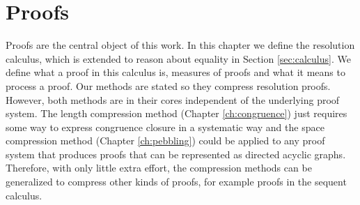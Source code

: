 \chapter*{Proofs}

Proofs are the central object of this work.
In this chapter we define the resolution calculus, which is extended to reason about equality in Section \ref{sec:calculus}.
We define what a proof in this calculus is, measures of proofs and what it means to process a proof.
Our methods are stated so they compress resolution proofs.
However, both methods are in their cores independent of the underlying proof system.
The length compression method (Chapter \ref{ch:congruence}) just requires some way to express congruence closure in a systematic way and the space compression method (Chapter \ref{ch:pebbling}) could be applied to any proof system that produces proofs that can be represented as directed acyclic graphs.
Therefore, with only little extra effort, the compression methods can be generalized to compress other kinds of proofs, for example proofs in the sequent calculus.



%

%



